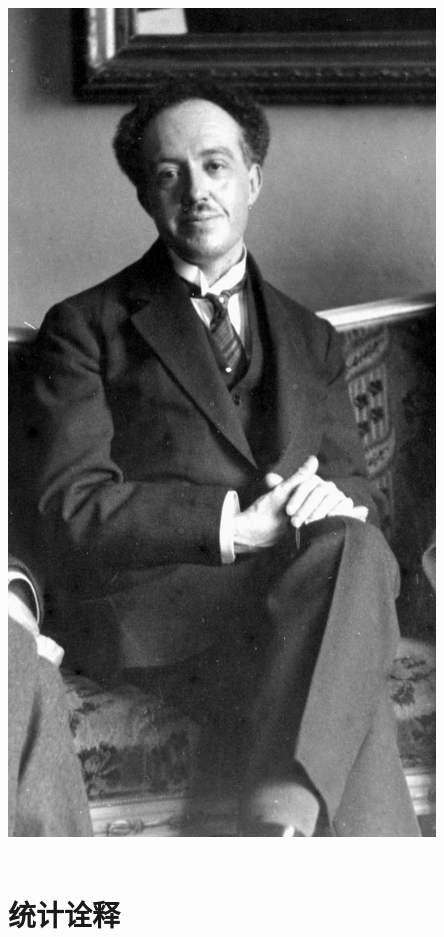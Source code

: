 \begin{frame}
\begin{columns}
\begin{column}[t]{0.46\linewidth}
\begin{center}
                    \includegraphics[width=0.85\textwidth]{figs/2021-12-03-18-00-05.png} \\
                \end{center} 
            \end{column}
        \end{columns}
\end{frame}

\section{统计诠释}

